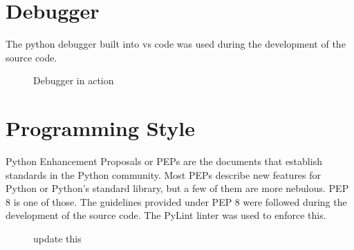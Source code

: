   \section{Debugger}
    The python debugger built into vs code was used during the development of the source code.
    \begin{figure}[h!]
      \centering
      \caption{Debugger in action}
      \label{fig:Debugger}
    \end{figure}

  \section{Programming Style}
  Python Enhancement Proposals or PEPs are the documents that establish standards in the Python community. Most PEPs describe new features for Python or Python's standard library, but a few of them are more nebulous. PEP 8 is one of those\cite{python}. The guidelines provided under PEP 8 were followed during the development of the source code. The PyLint linter was used to enforce this. 
    \begin{figure}[h!]
      \centering
      \caption{update this}
      \label{fig:linter}
    \end{figure}
  \pagebreak
